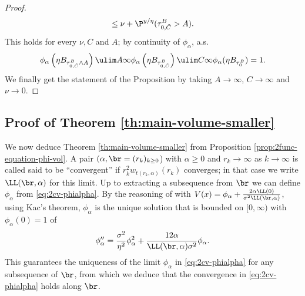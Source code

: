 \documentclass[10pt,a4paper]{article}
\begin{document}
\begin{proof}
\begin{multline*}
\leq \nu + \P^{y/\eta}(\tau^B_{0,\tilde C}>A)  .
\end{multline*}
This holds for every $\nu, C$ and $A$; by continuity of $\phi_\alpha$, a.s. %
\[ \phi_\alpha\left( \eta B_{\tau^B_{0,\tilde C} \wedge A} \right) \ulim A \infty \phi_\alpha\left( \eta B_{\tau^B_{0,\tilde C}} \right) \ulim C \infty \phi_\alpha(\eta B_{\tau^B_0}) = 1 . \]
We finally get the statement of the Proposition by taking $A\to\infty$, $C\to\infty$ and $\nu\to 0$. 
\end{proof}


\subsection{Proof of Theorem \ref{th:main-volume-smaller}}



We now deduce Theorem \ref{th:main-volume-smaller} from Proposition \ref{prop:2func-equation-phi-vol}. 
A pair $(\alpha, \br = (r_k)_{k\geq 0}$) with $\alpha\geq 0$ and $r_k\to\infty$ as $k\to\infty$ is called said to be ``convergent'' if $r_k^2 w_{t(r_k,\alpha)}(r_k)$ converges; in that case we write $\LL(\br, \alpha)$ for this limit. Up to extracting a subsequence from $\br$ we can define $\phi_\alpha$ from \eqref{eq:2cv-phialpha}. 
By the reasoning of \cite[Corollary 12]{lalley2015maximal} with $V(x) = \phi_\alpha + \frac{2\alpha\LL(0)}{\sigma^2 \LL(\br,\alpha)}$, using Kac's theorem, $\phi_\alpha$ is the unique solution that is bounded on $[0,\infty)$ with $\phi_\alpha(0)=1$ of
\begin{equation}\label{eq:2equadiff-phi-alpha}
\phi_\alpha'' = \frac{\sigma^2}{\eta^2} \phi_\alpha^2 + \frac{12\alpha}{\LL(\br,\alpha) \sigma^2} \phi_\alpha .
\end{equation}
This guarantees the uniqueness of the limit $\phi_\alpha$ in \eqref{eq:2cv-phialpha} for any subsequence of $\br$, from which we deduce that the convergence in \eqref{eq:2cv-phialpha} holds along $\br$. 
\end{document}
